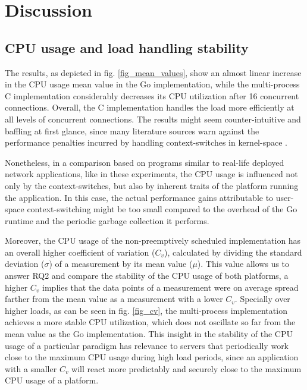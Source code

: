 \section{Discussion}
\subsection{CPU usage and load handling stability}
The results, as depicted in fig. \ref{fig_mean_values}, show an almost linear increase in the CPU usage mean value in the Go implementation, while the multi-process C implementation considerably decreases its CPU utilization after 16 concurrent connections. Overall, the C implementation handles the load more efficiently at all levels of concurrent connections. The results might seem counter-intuitive and baffling at first glance, since many literature sources warn against the performance penalties incurred by handling context-switches in kernel-space \cite{Cox-Buday2017}\cite{Kerrisk2010}. 

Nonetheless, in a comparison based on programs similar to real-life deployed network applications, like in these experiments, the CPU usage is influenced not only by the context-switches, but also by inherent traits of the platform running the application. In this case, the actual performance gains attributable to user-space context-switching might be too small compared to the overhead of the Go runtime and the periodic garbage collection it performs.

Moreover, the CPU usage of the non-preemptively scheduled implementation has an overall higher coefficient of variation ($C_v$), calculated by dividing the standard deviation ($\sigma$) of a measurement by its mean value ($\mu$). This value allows us to answer RQ2 and compare the stability of the CPU usage of both platforms, a higher $C_v$ implies that the data points of a measurement were on average spread farther from the mean value as a measurement with a lower $C_v$. Specially over higher loads, as can be seen in fig. \ref{fig_cv}, the multi-process implementation achieves a more stable CPU utilization, which does not oscillate so far from the mean value as the Go implementation. This insight in the stability of the CPU usage of a particular paradigm has relevance to servers that periodically work close to the maximum CPU usage during high load periods, since an application with a smaller $C_v$ will react more predictably and securely close to the maximum CPU usage of a platform.

